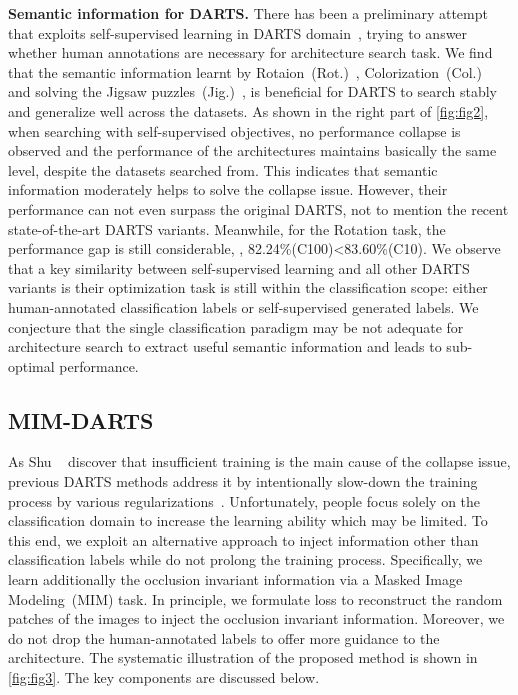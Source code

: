 \documentclass[10pt,twocolumn,letterpaper]{article}
\newcommand{\mypara}[1]{\vspace{1mm}\noindent\textbf{#1}}
\begin{document}
\mypara{Semantic information for DARTS.}
There has been a preliminary attempt that exploits self-supervised learning in DARTS domain~\cite{liu_2020_unnas}, trying to answer whether human annotations are necessary for architecture search task.
We find that the semantic information 
learnt by Rotaion~(Rot.)~\cite{gidaris_2018_rotation}, Colorization~(Col.)~\cite{zhang_2016_col} and solving the Jigsaw puzzles~(Jig.)~\cite{noroozi_2016_jigsaw},
is beneficial for DARTS to search stably and generalize well across the datasets.
As shown in the right part of \cref{fig:fig2}, when searching with self-supervised objectives, no performance collapse is observed and the performance of the architectures maintains basically the same level, despite the datasets searched from. 
This indicates that semantic information moderately helps to solve the collapse issue.
However, their performance can not even surpass the original DARTS, not to mention the recent state-of-the-art DARTS variants.
Meanwhile, for the Rotation task, the performance gap is still considerable, \ie, 82.24\%(C100)\textless83.60\%(C10).
We observe that a key similarity between self-supervised learning and all other DARTS variants is their optimization task is still within the classification scope: either human-annotated classification labels or self-supervised generated labels.
We conjecture that the single classification paradigm may be not adequate for architecture search to extract useful semantic information and leads to sub-optimal performance.

\subsection{MIM-DARTS}
\vspace{-4pt}
\label{sec:2tasks}
As Shu \etal~\cite{shu_2020_understanding} discover that insufficient training is the main cause of the collapse issue,
previous DARTS methods address it by intentionally slow-down the training process by various regularizations~\cite{chen_2020_sdarts,ye_2022_beta,liang2019darts+,Chen_2019_pdarts}.
Unfortunately, people focus solely on the classification domain to increase the learning ability which may be limited. To this end, we exploit an alternative approach to inject information other than classification labels while do not prolong the training process.
Specifically, we learn additionally the occlusion invariant information via a Masked Image Modeling~(MIM) task.
In principle, we formulate loss to reconstruct the random patches of the images to inject the occlusion invariant information.
Moreover, we do not drop the human-annotated labels to offer more guidance to the architecture.
The systematic illustration of the proposed method is shown in \cref{fig:fig3}.
The key components are discussed below.
\end{document}
